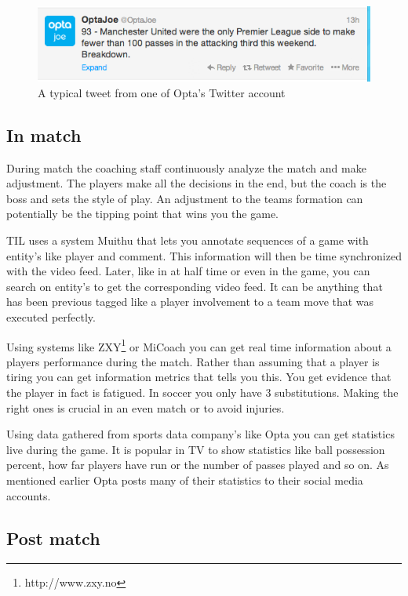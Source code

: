 \begin{figure}[ht!]
\centering
\includegraphics[width=1\textwidth]{images/general/optastats.png}
\caption{A typical tweet from one of Opta's Twitter account}
\label{fig:optastats}
\end{figure}

\subsection{In match}

During match the coaching staff continuously analyze the match and make adjustment. The players make all the decisions in the end, but the coach is the boss and sets the style of play. An adjustment to the teams formation can potentially be the tipping point that wins you the game.

\ac{TIL} uses a system Muithu \cite{muithu} that lets you annotate sequences of a game with entity's like player and comment. This information will then be time synchronized with the video feed. Later, like in at half time or even in the game, you can search on entity's to get the corresponding video feed. It can be anything that has been previous tagged like a player involvement to a team move that was executed perfectly. 

Using systems like \ac{ZXY}\footnote{http://www.zxy.no} or MiCoach \cite{bigdata:majorleague} you can get real time information about a players performance during the match. Rather than assuming that a player is tiring you can get information metrics that tells you this. You get evidence that the player in fact is fatigued. In soccer you only have 3 substitutions. Making the right ones is crucial in an even match or to avoid injuries.

Using data gathered from sports data company's like Opta you can get statistics live during the game. It is popular in TV to show statistics like ball possession percent, how far players have run or the number of passes played and so on. As mentioned earlier Opta posts many of their statistics to their social media accounts.

\subsection{Post match}

